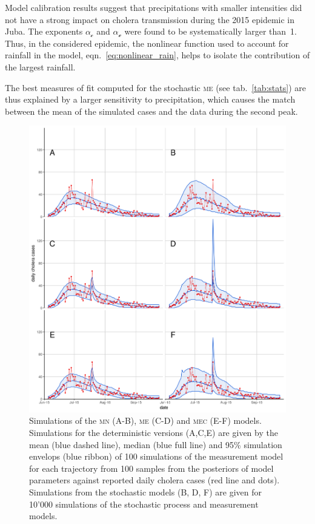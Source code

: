 Model calibration results suggest that precipitations with smaller intensities did not have a strong impact on cholera transmission during the 2015 epidemic in Juba. The exponents $\alpha_{\mathcal{c}}$ and $\alpha_{\mathcal{e}}$ were found to be systematically larger \mbox{than 1.} %
  Thus, in the considered epidemic, the nonlinear function used to account for rainfall in the model, eqn.~\eqref{eq:nonlinear_rain}, helps to isolate the contribution of the largest rainfall.

The best measures of fit computed for the stochastic \textsc{me} (see tab.~\ref{tab:stats}) are thus explained by a larger sensitivity to precipitation, which causes the match between the mean of the simulated cases and the data during the second peak.

\begin{figure}[ht]
    \centering
    \includegraphics{fig_cholera-rainfall/Lemaitre_ACTROP_2018_42_R1_fig4.png}
    \caption[Fit of the different models]{Simulations of the \textsc{mn} (A-B), \textsc{me} (C-D) and \textsc{mec} (E-F) models. Simulations for the deterministic versions (A,C,E) are given by the mean (blue dashed line), median (blue full line) and 95\% simulation envelops (blue ribbon) of 100 simulations of the measurement model for each trajectory from 100 samples from the posteriors of model parameters against reported daily cholera cases (red line and dots). Simulations from the stochastic models (B, D, F) are given for 10'000 simulations of the stochastic process and measurement models.}
    \label{fig:sim}
\end{figure}

